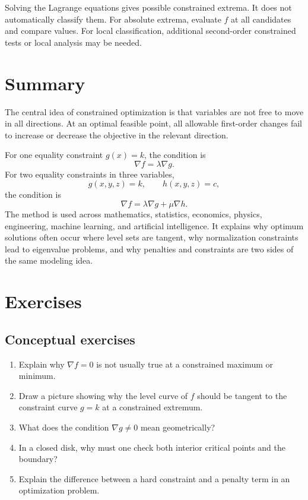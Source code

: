 \documentclass[11pt]{article}
\newcommand{\grad}{\nabla}
\begin{document}
\begin{warningbox}
Solving the Lagrange equations gives possible constrained extrema. It does not automatically classify them. For absolute extrema, evaluate $f$ at all candidates and compare values. For local classification, additional second-order constrained tests or local analysis may be needed.
\end{warningbox}

\section{Summary}

The central idea of constrained optimization is that variables are not free to move in all directions. At an optimal feasible point, all allowable first-order changes fail to increase or decrease the objective in the relevant direction.

For one equality constraint $g(x)=k$, the condition is
\[
\grad f=\lambda \grad g.
\]
For two equality constraints in three variables,
\[
g(x,y,z)=k,
\qquad h(x,y,z)=c,
\]
the condition is
\[
\grad f=\lambda \grad g+\mu \grad h.
\]
The method is used across mathematics, statistics, economics, physics, engineering, machine learning, and artificial intelligence. It explains why optimum solutions often occur where level sets are tangent, why normalization constraints lead to eigenvalue problems, and why penalties and constraints are two sides of the same modeling idea.

\section{Exercises}

\subsection*{Conceptual exercises}
\begin{enumerate}
  \item Explain why $\grad f=0$ is not usually true at a constrained maximum or minimum.
  \item Draw a picture showing why the level curve of $f$ should be tangent to the constraint curve $g=k$ at a constrained extremum.
  \item What does the condition $\grad g\ne 0$ mean geometrically?
  \item In a closed disk, why must one check both interior critical points and the boundary?
  \item Explain the difference between a hard constraint and a penalty term in an optimization problem.
\end{enumerate}
\end{document}
